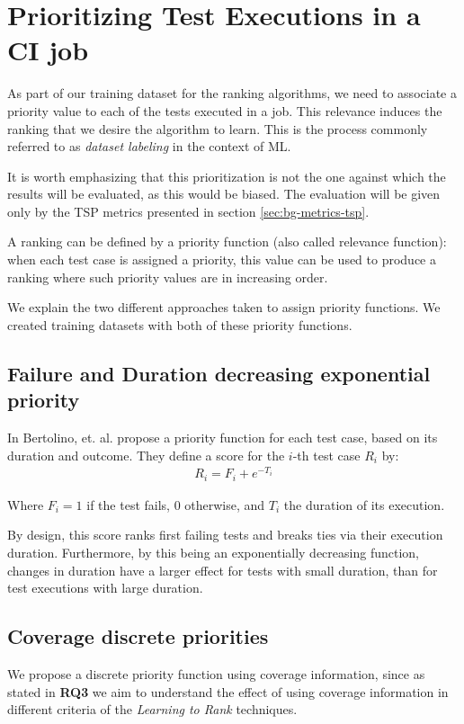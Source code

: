 \section{Prioritizing Test Executions in a CI job}\label{s:method-prioritizing-testruns}

As part of our training dataset for the ranking algorithms, we need to associate a priority value
to each of the tests executed in a job. This relevance induces the ranking that we desire the algorithm to 
learn. This is the process commonly referred to as \emph{dataset labeling} in the context of ML.

It is worth emphasizing that this prioritization is not the one against which the results
will be evaluated, as this would be biased. The evaluation will be given only by the 
TSP metrics presented in section \ref{sec:bg-metrics-tsp}.

A ranking can be defined by a priority function (also called relevance function): when each 
test case is assigned a priority, this value can be used to produce a ranking where such 
priority values are in increasing order.

We explain the two different approaches taken to assign priority functions. We created training datasets with both of these priority functions.

\subsection{Failure and Duration decreasing exponential priority}\label{s:method-prio-exp}

In \cite{Bertolino2020LearningtoRankVR} Bertolino, et. al. propose a priority function for each test case, based on its duration and outcome.
They define a score for the $i$-th test case $R_i$ by:
\begin{align*}
R_i = F_i + e^{-T_i}
\end{align*}

Where $F_i = 1$ if the test fails, $0$ otherwise, and $T_i$ the duration of its execution.

By design, this score ranks first failing tests and breaks ties via their execution duration.
Furthermore, by this being an exponentially decreasing function, changes
in duration have a larger effect for tests with small duration, than for test executions with
large duration.

\subsection{Coverage discrete priorities}\label{s:method-prioritizingtestcases}
We propose a discrete priority function using coverage information, since as stated in \textbf{RQ3}
we aim to understand the effect of using coverage information in different criteria of the
\emph{Learning to Rank} techniques.

